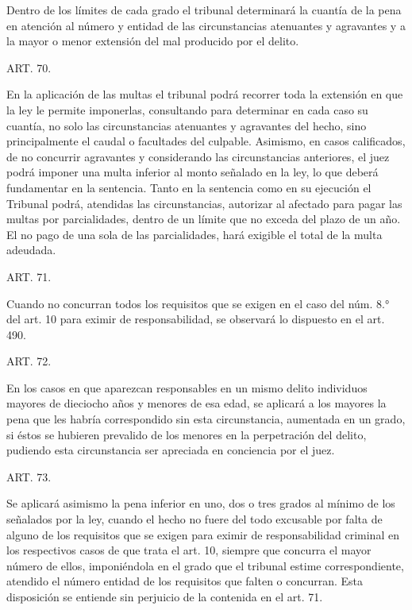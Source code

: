     Dentro de los límites de cada grado el tribunal determinará la cuantía de la pena en atención al número y entidad de las circunstancias atenuantes y agravantes y a la mayor o menor extensión del mal producido por el delito.


    ART. 70.

    En la aplicación de las multas el tribunal podrá recorrer toda la extensión en que la ley le permite imponerlas, consultando para determinar en cada caso su cuantía, no solo las circunstancias atenuantes y agravantes del hecho, sino principalmente el caudal o facultades del culpable. Asimismo, en casos calificados, de no concurrir agravantes y considerando las circunstancias anteriores, el juez podrá imponer una multa inferior al monto señalado en la ley, lo que deberá fundamentar en la sentencia.
    Tanto en la sentencia como en su ejecución el Tribunal podrá, atendidas las circunstancias, autorizar al afectado para pagar las multas por parcialidades, dentro de un límite que no exceda del plazo de un año. El no pago de una sola de las parcialidades, hará exigible el total de la multa adeudada.




    ART. 71.

    Cuando no concurran todos los requisitos que se exigen en el caso del núm. 8.° del art. 10 para eximir de responsabilidad, se observará lo dispuesto en el art. 490.



    ART. 72.

    En los casos en que aparezcan responsables en un mismo delito individuos mayores de dieciocho años y menores de esa edad, se aplicará a los mayores la pena que les habría correspondido sin esta circunstancia, aumentada en un grado, si éstos se hubieren prevalido de los menores en la perpetración del delito, pudiendo esta circunstancia ser apreciada en conciencia por el juez.




    ART. 73.

    Se aplicará asimismo la pena inferior en uno, dos o tres grados al mínimo de los señalados por la ley, cuando el hecho no fuere del todo excusable por falta de alguno de los requisitos que se exigen para eximir de responsabilidad criminal en los respectivos casos de que trata el art. 10, siempre que concurra el mayor número de ellos, imponiéndola en el grado que el tribunal estime correspondiente, atendido el número entidad de los requisitos que falten o concurran.
    Esta disposición se entiende sin perjuicio de la contenida en el art. 71.


